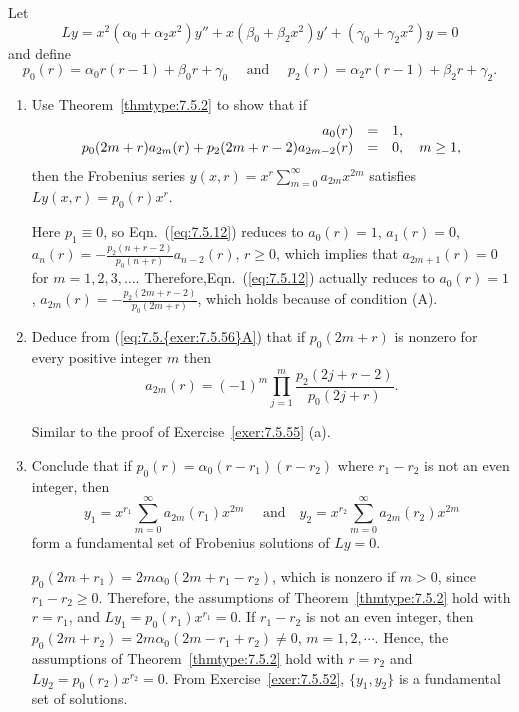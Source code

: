 \documentclass{ximera}
\begin{document}
\begin{problem}\label{exer:7.5.56}
Let
$$
Ly=x^2(\alpha_0+\alpha_2x^2)y''+x(\beta_0+\beta_2x^2)y'+
(\gamma_0+\gamma_2x^2)y=0
$$
and define
$$
p_0(r)=\alpha_0r(r-1)+\beta_0r+\gamma_0\quad\mbox{ and }\quad
p_2(r)=\alpha_2r(r-1)+\beta_2r+\gamma_2.
$$
\begin{enumerate}
\item %
Use Theorem~\ref{thmtype:7.5.2} to show that if
\begin{equation} \label{eq:7.5.{exer:7.5.56}A}
\begin{array}{rcl}
a_0(r)&=&1,\\
p_0(2m+r)a_{2m}(r)+p_2(2m+r-2)a_{2m-2}(r)&=&0,\quad m\geq 1,
\end{array}
\end{equation}
then the Frobenius series
 $y(x,r)=x^r\sum_{m=0}^\infty a_{2m}x^{2m}$ satisfies
$Ly(x,r)=p_0(r)x^r$.

\begin{solution}
    Here $p_1\equiv0$, so Eqn.~(\ref{eq:7.5.12}) reduces to
$a_0(r)=1$, $a_1(r)=0$, $a_n(r)=-\frac{p_2(n+r-2)}{
p_0(n+r)}a_{n-2}(r)$, $r\geq 0$, which implies that $a_{2m+1}(r)=0$
for $m=1,2,3,\dots$. Therefore,Eqn.~(\ref{eq:7.5.12}) actually reduces to
$a_0(r)=1$, $a_{2m}(r)=-\frac{p_2(2m+r-2)}{ p_0(2m+r)}$, which
holds because of condition (A).
\end{solution}

\item %
Deduce from (\ref{eq:7.5.{exer:7.5.56}A}) that  if $p_0(2m+r)$ is nonzero
for every positive integer $m$ then
$$
a_{2m}(r)=(-1)^m\prod_{j=1}^m\frac{p_2(2j+r-2)}{p_0(2j+r)}.
$$

\begin{solution}
    Similar to the proof of Exercise~\ref{exer:7.5.55} (a).
\end{solution}

\item %
Conclude that if $p_0(r)=\alpha_0(r-r_1)(r-r_2)$ where $r_1-r_2$
is not an even integer, then
$$
y_1=x^{r_1}\sum_{m=0}^\infty a_{2m}(r_1)x^{2m}\quad\mbox{ and
}\quad y_2=x^{r_2}\sum_{m=0}^\infty a_{2m}(r_2)x^{2m}
$$
form a fundamental set of  Frobenius solutions of $Ly=0$.

\begin{solution}
    $p_0(2m+r_1)=2m\alpha_0(2m+r_1-r_2)$,
which is nonzero if $m>0$, since $r_1-r_2\geq 0$. Therefore, the
assumptions of Theorem~\ref{thmtype:7.5.2} hold with $r=r_1$, and
$Ly_1=p_0(r_1)x^{r_1}=0$.
If $r_1-r_2$ is not an even integer, then
$p_0(2m+r_2)=2m\alpha_0(2m-r_1+r_2)\neq 0$, $m=1,2,\cdots$.
Hence, the assumptions of Theorem~\ref{thmtype:7.5.2} hold with $r=r_2$ and
 $Ly_2=p_0(r_2)x^{r_2}=0$.
From Exercise~\ref{exer:7.5.52},
$\{y_1,y_2\}$ is a fundamental set of solutions.
\end{solution}


\end{enumerate}
\end{problem}
\end{document}
